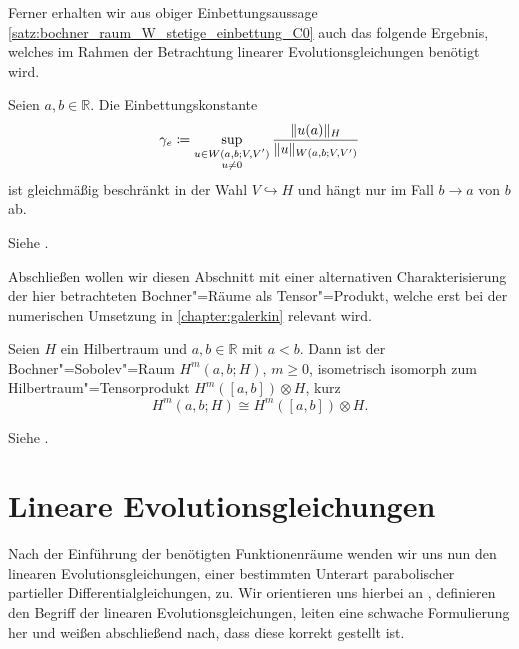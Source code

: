 Ferner erhalten wir aus obiger Einbettungsaussage \cref{satz:bochner_raum_W_stetige_einbettung_C0} auch das folgende Ergebnis, welches im Rahmen der Betrachtung linearer Evolutionsgleichungen benötigt wird.

\begin{Korollar}
\label{korollar:einbettungskonstante_M_e}
    Seien $a, b \in \mathbb{R}$.
    Die Einbettungskonstante
    \begin{equation}
        \label{eq:einbettungskonstante_M_e}
        \gamma_{e} \coloneqq \sup_{\substack{u\in W(a, b; V, V')\\u \neq 0}} \frac{\lVert u(a)\rVert_{H}}{\lVert u\rVert_{W(a, b; V, V')}}
    \end{equation}
    ist gleichmäßig beschränkt in der Wahl $V \hookrightarrow H$ und hängt nur im Fall $b \to a$ von $b$ ab.

    \begin{Beweis}
        Siehe \cites[Section 5]{Schwab:2009ec}[Beweis zu Theorem XVIII.2.1]{Dautray:1992by}.
    \end{Beweis}
\end{Korollar}

Abschließen wollen wir diesen Abschnitt mit einer alternativen Charakterisierung der hier betrachteten Bochner"=Räume als Tensor"=Produkt, welche erst bei der numerischen Umsetzung in \cref{chapter:galerkin} relevant wird.

\begin{Satz}
\label{satz:bochner_sobolev_raum_als_tensorprodukt}
    Seien $H$ ein Hilbertraum und $a, b \in \mathbb{R}$ mit $a < b$.
    Dann ist der Bochner"=Sobolev"=Raum $H^{m}(a, b; H)$, $m \geq 0$, isometrisch isomorph zum Hilbertraum"=Tensorprodukt $H^{m}([a, b]) \otimes H$, kurz
    \begin{equation}
        H^{m}(a, b; H) \cong H^{m}([a, b]) \otimes H.
    \end{equation}

    \begin{Beweis}
        Siehe \cite[Theorem 12.6.1, Theorem 12.7.1]{Aubin:2000un}.
    \end{Beweis}
\end{Satz}


\section{Lineare Evolutionsgleichungen} %
\label{section:lineare_evolutionsgleichungen}

Nach der Einführung der benötigten Funktionenräume wenden wir uns nun den linearen Evolutionsgleichungen, einer bestimmten Unterart parabolischer partieller Differentialgleichungen, zu.
Wir orientieren uns hierbei an \textcite{Lions:1971wp,Schwab:2009ec,Urban:2014kg},
definieren den Begriff der linearen Evolutionsgleichungen, leiten eine schwache Formulierung her und weißen abschließend nach, dass diese korrekt gestellt ist.

